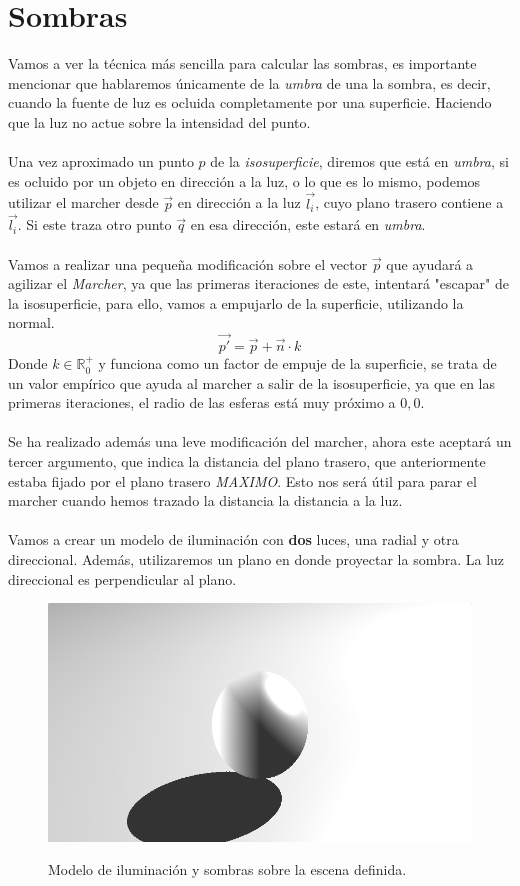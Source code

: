 \section{Sombras}
Vamos a ver la técnica más sencilla para calcular las sombras, es importante mencionar que hablaremos únicamente de la \textit{umbra} de una la sombra, es decir, cuando la fuente de luz es ocluida completamente por una superficie. Haciendo que la luz no actue sobre la intensidad del punto.\\\\Una vez aproximado un punto \(p\) de la \textit{isosuperficie}, diremos que está en \textit{umbra}, si es ocluido por un objeto en dirección a la luz, o lo que es lo mismo, podemos utilizar el marcher desde \(\Vec{p}\) en dirección a la luz \(\Vec{l_i}\), cuyo plano trasero contiene a \(\Vec{l_i}\). Si este traza otro punto \(\Vec{q}\) en esa dirección, este estará en \textit{umbra}.\\\\
Vamos a realizar una pequeña modificación sobre el vector \(\Vec{p}\) que ayudará a agilizar el \textit{Marcher}, ya que las primeras iteraciones de este, intentará "escapar" de la isosuperficie, para ello, vamos a empujarlo de la superficie, utilizando la normal.
\[\Vec{p'}=\Vec{p} + \Vec{n} \cdot k\]
Donde \(k\in\mathbb{R}^{+}_{0}\) y funciona como un factor de empuje de la superficie, se trata de un valor empírico que ayuda al marcher a salir de la isosuperficie, ya que en las primeras iteraciones, el radio de las esferas está muy próximo a \(0,0\). \\\\
Se ha realizado además una leve modificación del marcher, ahora este aceptará un tercer argumento, que indica la distancia del plano trasero, que anteriormente estaba fijado por el plano trasero \textit{MAXIMO}. Esto nos será útil para parar el marcher cuando hemos trazado la distancia la distancia a la luz.\\\\
Vamos a crear un modelo de iluminación con \textbf{dos} luces, una radial y otra direccional. Además, utilizaremos un plano en donde proyectar la sombra. La luz direccional es perpendicular al plano.
\begin{figure}[H]
  \centering
  \captionsetup{justification=centering}%
  \includegraphics[width=1.0\textwidth]{secciones/imagenes/lightmodel/sombra_dura.png}\label{fig:shadow}
  \caption{Modelo de iluminación y sombras sobre la escena definida.}
\end{figure}
